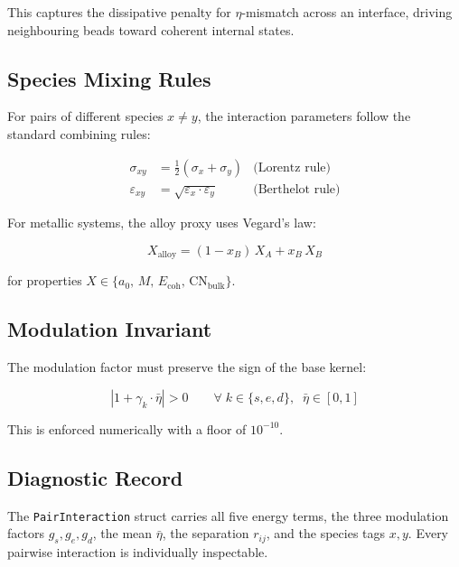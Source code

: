 \documentclass[11pt, a4paper, oneside]{article}
\newcommand{\type}[1]{\texttt{#1}}
\begin{document}
This captures the dissipative penalty for $\eta$-mismatch across an
interface, driving neighbouring beads toward coherent internal states.

\subsection{Species Mixing Rules}

For pairs of different species $x \neq y$, the interaction parameters
follow the standard combining rules:

\begin{align}
\sigma_{xy} &= \tfrac{1}{2}(\sigma_x + \sigma_y)
  &\text{(Lorentz rule)} \label{eq:lorentz} \\
\varepsilon_{xy} &= \sqrt{\varepsilon_x \cdot \varepsilon_y}
  &\text{(Berthelot rule)} \label{eq:berthelot}
\end{align}

For metallic systems, the alloy proxy uses Vegard's law:

\begin{equation}
X_{\mathrm{alloy}} = (1 - x_B)\,X_A + x_B\,X_B
\label{eq:vegard}
\end{equation}

for properties $X \in \{a_0,\, M,\, E_{\mathrm{coh}},\, \mathrm{CN}_{\mathrm{bulk}}\}$.

\subsection{Modulation Invariant}

The modulation factor must preserve the sign of the base kernel:

\begin{equation}
|1 + \gamma_k \cdot \bar\eta| > 0
\qquad \forall\; k \in \{s, e, d\},\;\; \bar\eta \in [0, 1]
\label{eq:modulation_invariant}
\end{equation}

This is enforced numerically with a floor of $10^{-10}$.

\subsection{Diagnostic Record}

The \type{PairInteraction} struct carries all five energy terms,
the three modulation factors $g_s, g_e, g_d$, the mean $\bar\eta$,
the separation $r_{ij}$, and the species tags $x, y$.  Every pairwise
interaction is individually inspectable.
\end{document}

